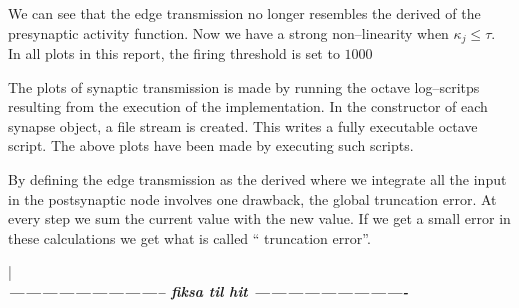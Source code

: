 			We can see that the edge transmission no longer resembles the derived of the presynaptic activity function. 
			Now we have a strong non--linearity when $\kappa_j \leq \tau$.
			In all plots in this report, the firing threshold is set to $1000$

			The plots of synaptic transmission is made by running the octave log--scritps resulting from the execution of the implementation.
			In the constructor of each synapse object, a file stream is created. 
			This writes a fully executable octave script. The above plots have been made by executing such scripts.


	
			By defining the edge transmission as the derived where we integrate all the input in the postsynaptic node involves one drawback, the global truncation error.
			At every step we sum the current value with the new value. If we get a small error in these calculations we get what is called `` truncation error''.






| \\ \emph{\bf\large{{----------------------------- fiksa til hit ----------------------------}}}\\




